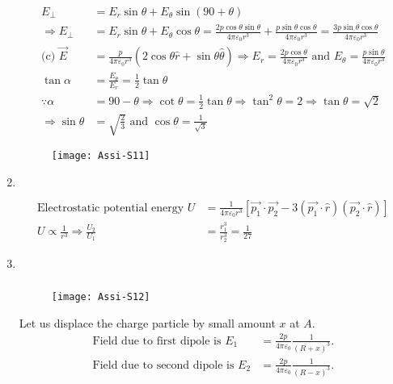 \begin{enumerate}
\begin{answer}
\begin{align*}
	E_{\perp}&=E_{r} \sin \theta+E_{\theta} \sin (90+\theta) \\
	\Rightarrow E_{\perp}&=E_{r} \sin \theta+E_{\theta} \cos \theta=\frac{2 p \cos \theta \sin \theta}{4 \pi \varepsilon_{0} r^{3}}+\frac{p \sin \theta \cos \theta}{4 \pi \varepsilon_{0} r^{3}}=\frac{3 p \sin \theta \cos \theta}{4 \pi \varepsilon_{0} r^{3}}\\
	\text{(c) }\vec{E}&=\frac{p}{4 \pi \varepsilon_{0} r^{3}}(2 \cos \theta \hat{r}+\sin \theta \hat{\theta}) \Rightarrow E_{r}=\frac{2 p \cos \theta}{4 \pi \varepsilon_{0} r^{3}}\text{ and }E_{\theta}=\frac{p \sin \theta}{4 \pi \varepsilon_{0} r^{3}}\\
	\tan \alpha&=\frac{E_{\theta}}{E_{r}}=\frac{1}{2} \tan \theta\\
	\because \alpha&=90-\theta \Rightarrow \cot \theta=\frac{1}{2} \tan \theta \Rightarrow \tan ^{2} \theta=2 \Rightarrow \tan \theta=\sqrt{2}\\
	\Rightarrow \sin \theta&=\sqrt{\frac{2}{3}}\text{ and }\cos \theta=\frac{1}{\sqrt{3}}
	\end{align*}
	\begin{figure}[H]
		\centering
		\texttt{[image: Assi-S11]}
	\end{figure}
\end{answer}
\item $\left. \right. $
\begin{answer}
	\begin{align*}
	 \text{Electrostatic potential energy }U&=\frac{1}{4 \pi \varepsilon_{0} r^{3}}\left[\overrightarrow{p_{1}} \cdot \overrightarrow{p_{2}}-3\left(\overrightarrow{p_{1}} \cdot \hat{r}\right)\left(\overrightarrow{p_{2}} \cdot \hat{r}\right)\right]\\
	U \propto \frac{1}{r^{3}} \Rightarrow \frac{U_{2}}{U_{1}}&=\frac{r_{1}^{3}}{r_{2}^{3}}=\frac{1}{27}
	\end{align*}
\end{answer}
\item $\left. \right. $
\begin{answer}$\left. \right. $
	\begin{figure}[H]
		\centering
		\texttt{[image: Assi-S12]}
	\end{figure}
	Let us displace the charge particle by small amount $x$ at $A$.
	\begin{align*}
	\text{Field due to first dipole is }E_{1}&=\frac{2 p}{4 \pi \varepsilon_{0}} \frac{1}{(R+x)^{3}}.\\
	\text{Field due to second dipole is }E_{2}&=\frac{2 p}{4 \pi \varepsilon_{0}} \frac{1}{(R-x)^{3}}.

\end{align*}
\end{answer}
\end{enumerate}
